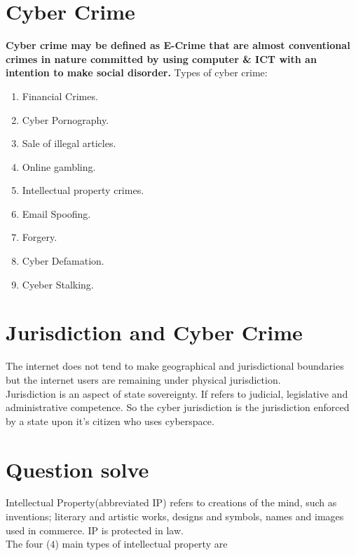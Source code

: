 \documentclass[14 pt, letterpaper]{extarticle}
\begin{document}
	\section{Cyber Crime}
	\textbf{Cyber crime may be defined as E-Crime that are almost conventional crimes in nature committed by using computer \& ICT with an intention to make social disorder.}
	\linebreak
	Types of cyber crime:
	\begin{enumerate}
		\item Financial Crimes.
		\item Cyber Pornography.
		\item Sale of illegal articles.
		\item Online gambling.
		\item Intellectual property crimes.
		\item Email Spoofing.
		\item Forgery.
		\item Cyber Defamation.
		\item Cyeber Stalking.
	\end{enumerate}
	
	\section{Jurisdiction and Cyber Crime}
	The internet does not tend to make geographical and jurisdictional boundaries but the internet users are remaining under physical jurisdiction. \\
	Jurisdiction is an aspect of state sovereignty. If refers to judicial, legislative and administrative competence.
	So the cyber jurisdiction is the jurisdiction enforced by a state upon it's citizen who uses cyberspace.
	
	\section{Question solve}
	Intellectual Property(abbreviated IP) refers to creations of the mind, such as inventions; literary and artistic works, designs and symbols, names and images used in commerce. IP is protected in law. \\
	The four ($4$) main types of intellectual property are
	
\end{document}
